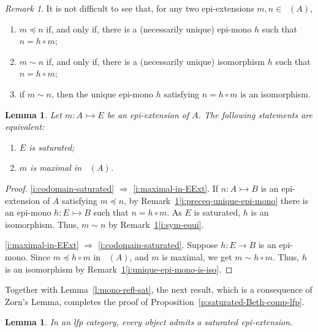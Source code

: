 \documentclass[a4paper,10pt,reqno]{amsart}
\newtheorem{lemma}[theorem]{Lemma}
\theoremstyle{definition}
\theoremstyle{remark}
\newtheorem{remark}[theorem]{Remark}
\newcommand{\emb}{\rightarrowtail}							%
\DeclareMathOperator{\EExt}{Ext_{p}}					%
\newcommand{\IMP}{\Rightarrow}						%
\begin{document}
\begin{remark}\label{rem:order-on-epi-ext}
It is not difficult to see that, for any two epi-extensions $m,n\in \EExt(A)$,
\begin{enumerate}[label=(\roman*)]
\item\label{i:preceq-unique-epi-mono} $m\preccurlyeq n$ if, and only if, there is a (necessarily unique) epi-mono $h$ such that $n=h\circ m$;
\item\label{i:sym-equi} $m\sim n$ if, and only if, there is a (necessarily unique) isomorphism $h$ such that $n=h\circ m$;
\item\label{i:unique-epi-mono-is-iso} if $m\sim n$, then the unique epi-mono $h$ satisfying $n=h\circ m$ is an isomorphism.
\end{enumerate}
\end{remark}

\begin{lemma}\label{l:maximal-saturated}
Let ${m\colon A\emb E}$ be an epi-extension of $A$. The following statements are equivalent:
\begin{enumerate}[label=(\arabic*)]
\item\label{i:codomain-saturated} $E$ is saturated;
\item\label{i:maximal-in-EExt} $m$ is maximal in $\EExt(A)$.
\end{enumerate}
\end{lemma}

\begin{proof}
\ref{i:codomain-saturated} $\IMP$ \ref{i:maximal-in-EExt}. If $n\colon A\emb B$ is an epi-extension of $A$ satisfying $m\preccurlyeq n$, by Remark~\ref{rem:order-on-epi-ext}\ref{i:preceq-unique-epi-mono} there is an epi-mono $h\colon E\emb B$ such that $n=h\circ m$. As $E$ is saturated, $h$ is an isomorphism. Thus, $m\sim n$ by Remark~\ref{rem:order-on-epi-ext}\ref{i:sym-equi}.

\ref{i:maximal-in-EExt} $\IMP$ \ref{i:codomain-saturated}. Suppose $h\colon E\to B$ is an epi-mono. Since $m\preccurlyeq h\circ m$ in $\EExt(A)$, and $m$ is maximal, we get $m\sim h\circ m$. Thus, $h$ is an isomorphism by Remark~\ref{rem:order-on-epi-ext}\ref{i:unique-epi-mono-is-iso}.
\end{proof}

Together with Lemma~\ref{l:mono-refl-sat}, the next result, which is a consequence of Zorn's Lemma, completes the proof of Proposition~\ref{p:saturated-Beth-comp-lfp}.

\begin{lemma}\label{l:existence-saturated-epi-ext}
In an lfp category, every object admits a saturated epi-extension.
\end{lemma}
\end{document}
